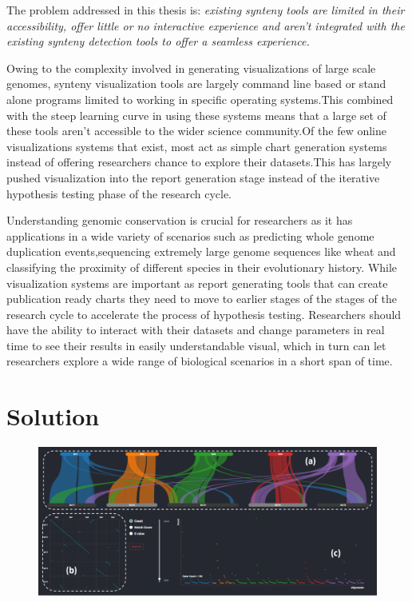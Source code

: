 The problem addressed in this thesis is: \textit{existing synteny tools are limited in their accessibility, offer little or no interactive experience and aren't integrated with the existing synteny detection tools to offer a seamless experience.}

Owing to the complexity involved in generating visualizations of large scale genomes, synteny visualization tools are largely command line based or stand alone programs limited to working in specific operating systems.This combined with the steep learning curve in using these systems means that a large set of these tools aren't accessible to the wider science community.Of the few online visualizations systems that exist, most act as simple chart generation systems instead of offering researchers chance to explore their datasets.This has largely pushed visualization into the report generation stage instead of the  iterative hypothesis testing phase of the research cycle.

Understanding genomic conservation is crucial for researchers as it has applications in a wide variety of scenarios such as predicting whole genome duplication events,sequencing extremely large genome sequences like wheat and classifying the proximity of different species in their evolutionary history.
While visualization systems are important as report generating tools that can create publication ready charts they need to move to earlier stages of the stages of the research cycle to accelerate the process of hypothesis testing.
Researchers should have the ability to interact with their datasets and change parameters in real time to see their results in easily understandable visual,
which in turn can let researchers explore a wide range of biological scenarios in a short span of time.

\section{Solution}

\begin{figure}
  \centering
  \includegraphics[width=.75\linewidth]{images/ch_1_dashboard.PNG}
  \label{fig:ch_1_dashboard}
\end{figure}

